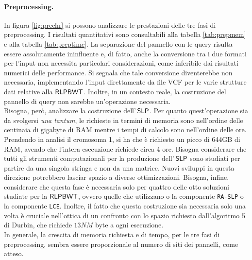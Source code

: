 \paragraph{Preprocessing.}
In figura \ref{fig:prechr} si possono analizzare le prestazioni delle tre
fasi di preprocessing. I risultati quantitativi sono consultabili alla tabella
\ref{tab:prepmem} e alla tabella \ref{tab:preptime}. La separazione del
pannello con le query risulta essere assolutamente 
ininfluente e, di fatto, anche la conversione tra i due formati per l'input non
necessita particolari considerazioni, come inferibile dai risultati numerici
delle performance. Si segnala che tale conversione 
diventerebbe non necessaria, implementando l'input direttamente da file VCF per
le varie strutture dati relative alla $\mbox{\rm {\sf RLPBWT}}$. Inoltre, in un contesto
reale, la costruzione del pannello di query non sarebbe un'operazione
necessaria.\\
Bisogna, però, analizzare la costruzione 
dell'$\,\mbox{\rm {\sf SLP}}$. Per quanto quest'operazione sia da svolgersi \textit{una
  tantum}, le richieste in termini di memoria sono nell'ordine delle centinaia
di gigabyte di RAM mentre i tempi di calcolo sono nell'ordine delle
ore. Prendendo in analisi il cromosoma 1, si ha che è richiesto un picco
di 644GB di RAM, avendo che l'intera esecuzione richiede circa 4 ore.
Bisogna considerare che tutti gli strumenti computazionali per la
produzione 
dell'$\,\mbox{\rm {\sf SLP}}$ sono studiati per partire da una singola stringa e non da una
matrice. Nuovi sviluppi in questa direzione potrebbero lasciar spazio a diverse
ottimizzazioni. Bisogna, infine, considerare che
questa fase è necessaria solo per quattro delle otto soluzioni studiate per la
$\mbox{\rm {\sf RLPBWT}}$, ovvero quelle che utilizzano o la componente \texttt{RA-SLP} o la
componente \texttt{LCE}. 
Inoltre, il fatto che questa costruzione sia necessaria solo una volta 
è cruciale nell'ottica di un confronto con
lo spazio richiesto dall'algoritmo 5 di Durbin, che richiede $13NM$
byte a ogni esecuzione.\\
In generale, la crescita di memoria richiesta e di tempo, per le tre fasi di
preprocessing, sembra essere proporzionale al numero di siti dei pannelli, come
atteso.
